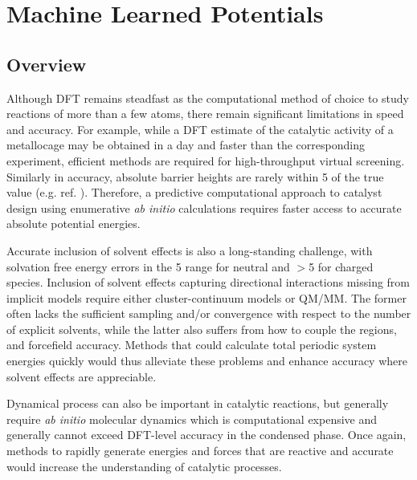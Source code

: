 \documentclass[../../main.tex]{subfiles}
\begin{document}
\setcounter{footnote}{0} 
\newcommand{\rom}[1]{\uppercase\expandafter{\romannumeral #1\relax}}


\chapter{Machine Learned Potentials}

\section{Overview}

Although DFT remains steadfast as the computational method of choice to study reactions of more than a few atoms,\cite{PribramJones2015} there remain significant limitations in speed and accuracy.\cite{Mardirossian2017} For example, while a DFT estimate of the catalytic activity of a metallocage may be obtained in a day\cite{Young2019} and faster than the corresponding experiment, efficient methods are required for high-throughput virtual screening. Similarly in accuracy, absolute barrier heights are rarely within 5 \kcalx of the true value (e.g. ref. \cite{Krongchon2017}). Therefore, a predictive computational approach to catalyst design using enumerative \emph{ab initio} calculations requires faster access to accurate absolute potential energies. 

Accurate inclusion of solvent effects is also a long-standing challenge, with solvation free energy errors in the 5 \kcalx range for neutral and $>$5 \kcalx for charged species.\cite{Zhang2017} Inclusion of solvent effects capturing directional interactions missing from implicit models require either cluster-continuum models or QM/MM. The former often lacks the sufficient sampling and/or convergence with respect to the number of explicit solvents,\cite{Basdogan2018} while the latter also suffers from how to couple the regions, and forcefield accuracy.\cite{Thiel2009} Methods that could calculate total periodic system energies quickly would thus alleviate these problems and enhance accuracy where solvent effects are appreciable.

Dynamical process can also be important in catalytic reactions,\cite{Grajciar2018, Stirling2014} but generally require \emph{ab initio} molecular dynamics which is computational expensive and generally cannot exceed DFT-level accuracy in the condensed phase.\cite{Hassanali2014} Once again, methods to rapidly generate energies and forces that are reactive and accurate would increase the understanding of catalytic processes.
\end{document}
